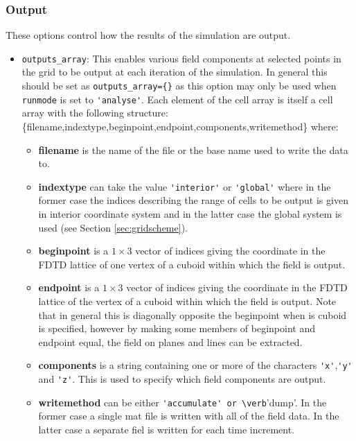 \documentclass[a4paper, 12pt]{article}
\begin{document}
	\subsubsection{Output}
	These options control how the results of the simulation are output.
	\begin{itemize}
		\item \verb+outputs_array+: This enables various field components at
		selected points in the grid to be output at each iteration of the
		simulation. In general this should be set as \verb+outputs_array={}+
		as this option may only be used when \verb+runmode+ is set to
		\verb+'analyse'+. Each element of the cell array is itself a cell
		array with the following structure:
		\{filename,indextype,beginpoint,endpoint,components,writemethod\}
		where:
		\begin{itemize}
			\item \textbf{filename} is the name of the file or the base name used to
			write the data to.
			\item \textbf{indextype} can take the value \verb+'interior'+ or \verb+'global'+
			where in the former case the indices describing the range of cells
			to be output is given in interior coordinate system and in the
			latter case the global system is used (see Section
			\ref{sec:gridscheme}).
			\item \textbf{beginpoint} is a $1\times 3$ vector of indices giving
			the coordinate in the FDTD lattice of one vertex of a cuboid within
			which the field is output.
			\item \textbf{endpoint} is a $1\times 3$ vector of indices giving
			the coordinate in the FDTD lattice of the vertex of a cuboid within
			which the field is output. Note that in general this is diagonally
			opposite the beginpoint when is cuboid is specified, however by
			making some members of beginpoint and endpoint equal, the field on
			planes and lines can be extracted.
			\item \textbf{components} is a string containing one or more of the
			characters \verb+'x'+,\verb+'y'+ and
			\verb+'z'+.
			This is used to specify which field components are output.
			\item \textbf{writemethod} can be either
			\verb+'accumulate' or \verb+'dump'. In the former case a single mat
			file is written with all of the field data. In the latter case a
			separate fiel is written for each time increment.
		\end{itemize}


\end{itemize}
\end{document}
